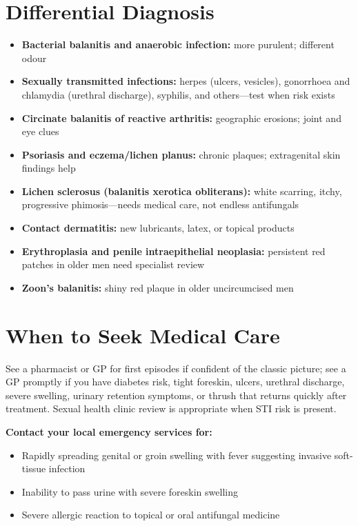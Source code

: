 \section*{Differential Diagnosis}
\begin{itemize}
    \item \textbf{Bacterial balanitis and anaerobic infection:} more purulent; different odour
    \item \textbf{Sexually transmitted infections:} herpes (ulcers, vesicles), gonorrhoea and chlamydia (urethral discharge), syphilis, and others---test when risk exists
    \item \textbf{Circinate balanitis of reactive arthritis:} geographic erosions; joint and eye clues
    \item \textbf{Psoriasis and eczema/lichen planus:} chronic plaques; extragenital skin findings help
    \item \textbf{Lichen sclerosus (balanitis xerotica obliterans):} white scarring, itchy, progressive phimosis---needs medical care, not endless antifungals
    \item \textbf{Contact dermatitis:} new lubricants, latex, or topical products
    \item \textbf{Erythroplasia and penile intraepithelial neoplasia:} persistent red patches in older men need specialist review
    \item \textbf{Zoon's balanitis:} shiny red plaque in older uncircumcised men
\end{itemize}

\section*{When to Seek Medical Care}
See a pharmacist or GP for first episodes if confident of the classic picture; see a GP promptly if you have diabetes risk, tight foreskin, ulcers, urethral discharge, severe swelling, urinary retention symptoms, or thrush that returns quickly after treatment. Sexual health clinic review is appropriate when STI risk is present.

\textbf{Contact your local emergency services for:}
\begin{itemize}
    \item Rapidly spreading genital or groin swelling with fever suggesting invasive soft-tissue infection
    \item Inability to pass urine with severe foreskin swelling
    \item Severe allergic reaction to topical or oral antifungal medicine
\end{itemize}

